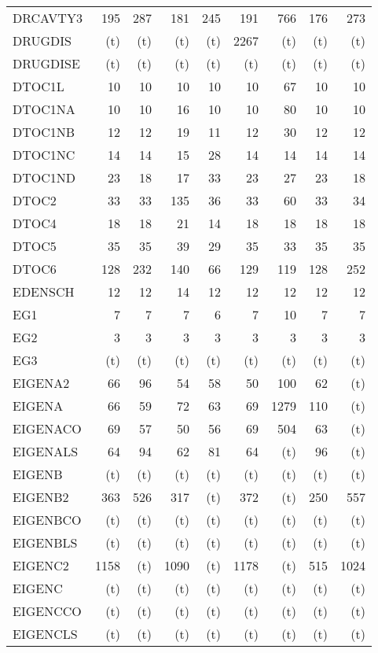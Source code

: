 \documentclass[11pt,twoside]{article}
\begin{document}
{\begin{longtable}[c]{|l|r|r|r|r|r|r|r|r|}
 DRCAVTY3 & 195 & 287 & 181 & 245 & 191 & 766 & 176 & 273 \\
 DRUGDIS & (t) & (t) & (t) & (t) & 2267 & (t) & (t) & (t) \\
 DRUGDISE & (t) & (t) & (t) & (t) & (t) & (t) & (t) & (t) \\
 DTOC1L & 10 & 10 & 10 & 10 & 10 & 67 & 10 & 10 \\
 DTOC1NA & 10 & 10 & 16 & 10 & 10 & 80 & 10 & 10 \\
 DTOC1NB & 12 & 12 & 19 & 11 & 12 & 30 & 12 & 12 \\
 DTOC1NC & 14 & 14 & 15 & 28 & 14 & 14 & 14 & 14 \\
 DTOC1ND & 23 & 18 & 17 & 33 & 23 & 27 & 23 & 18 \\
 DTOC2 & 33 & 33 & 135 & 36 & 33 & 60 & 33 & 34 \\
 DTOC4 & 18 & 18 & 21 & 14 & 18 & 18 & 18 & 18 \\
 DTOC5 & 35 & 35 & 39 & 29 & 35 & 33 & 35 & 35 \\
 DTOC6 & 128 & 232 & 140 & 66 & 129 & 119 & 128 & 252 \\
 EDENSCH & 12 & 12 & 14 & 12 & 12 & 12 & 12 & 12 \\
 EG1 & 7 & 7 & 7 & 6 & 7 & 10 & 7 & 7 \\
 EG2 & 3 & 3 & 3 & 3 & 3 & 3 & 3 & 3 \\
 EG3 & (t) & (t) & (t) & (t) & (t) & (t) & (t) & (t) \\
 EIGENA2 & 66 & 96 & 54 & 58 & 50 & 100 & 62 & (t) \\
 EIGENA & 66 & 59 & 72 & 63 & 69 & 1279 & 110 & (t) \\
 EIGENACO & 69 & 57 & 50 & 56 & 69 & 504 & 63 & (t) \\
 EIGENALS & 64 & 94 & 62 & 81 & 64 & (t) & 96 & (t) \\
 EIGENB & (t) & (t) & (t) & (t) & (t) & (t) & (t) & (t) \\
 EIGENB2 & 363 & 526 & 317 & (t) & 372 & (t) & 250 & 557 \\
 EIGENBCO & (t) & (t) & (t) & (t) & (t) & (t) & (t) & (t) \\
 EIGENBLS & (t) & (t) & (t) & (t) & (t) & (t) & (t) & (t) \\
 EIGENC2 & 1158 & (t) & 1090 & (t) & 1178 & (t) & 515 & 1024 \\
 EIGENC & (t) & (t) & (t) & (t) & (t) & (t) & (t) & (t) \\
 EIGENCCO & (t) & (t) & (t) & (t) & (t) & (t) & (t) & (t) \\
 EIGENCLS & (t) & (t) & (t) & (t) & (t) & (t) & (t) & (t) \\

\end{longtable}}
\end{document}
